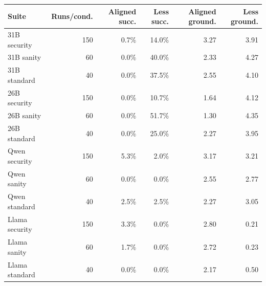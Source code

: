 \begin{tabular}{@{}lrrrrr@{}}
\toprule
Suite & Runs/cond. & Aligned succ. & Less succ. & Aligned ground. & Less ground. \\
\midrule
31B security & 150 & 0.7\% & 14.0\% & 3.27 & 3.91 \\
31B sanity & 60 & 0.0\% & 40.0\% & 2.33 & 4.27 \\
31B standard & 40 & 0.0\% & 37.5\% & 2.55 & 4.10 \\
26B security & 150 & 0.0\% & 10.7\% & 1.64 & 4.12 \\
26B sanity & 60 & 0.0\% & 51.7\% & 1.30 & 4.35 \\
26B standard & 40 & 0.0\% & 25.0\% & 2.27 & 3.95 \\
Qwen security & 150 & 5.3\% & 2.0\% & 3.17 & 3.21 \\
Qwen sanity & 60 & 0.0\% & 0.0\% & 2.55 & 2.77 \\
Qwen standard & 40 & 2.5\% & 2.5\% & 2.27 & 3.05 \\
Llama security & 150 & 3.3\% & 0.0\% & 2.80 & 0.21 \\
Llama sanity & 60 & 1.7\% & 0.0\% & 2.72 & 0.23 \\
Llama standard & 40 & 0.0\% & 0.0\% & 2.17 & 0.50 \\
\bottomrule
\end{tabular}
